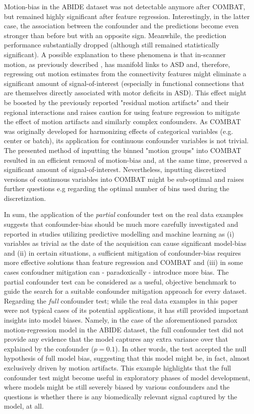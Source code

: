\documentclass{article}
\begin{document}
Motion-bias in the ABIDE dataset was not detectable anymore after COMBAT, but remained highly significant after feature regression.
Interestingly, in the latter case, the association between the confounder and the predictions become even stronger than before but with an opposite sign. Meanwhile, the prediction performance substantially dropped (although still remained statistically significant). 
A possible explanation to these phenomena is that in-scanner motion, as previously described \citep{fournier2010motor, anzulewicz2016toward}, has manifold links to ASD and, therefore, regressing out motion estimates from the connectivity features might eliminate a significant amount of signal-of-interest (especially in functional connections that are themselves directly associated with motor deficits in ASD).
This effect might be boosted by the previously reported "residual motion artifacts" and their regional interactions \citep{spisak2014voxel} and raises caution for using feature regression to mitigate the effect of motion artifacts and similarly complex confounders.
 As COMBAT was originally developed for harmonizing effects of categorical variables (e.g. center or batch), its application for continuous confounder variables is not trivial. The presented method of inputting the binned "motion groups" into COMBAT resulted in an efficient removal of motion-bias and, at the same time, preserved a significant amount of signal-of-interest. 
 Nevertheless, inputting discretized versions of continuous variables into COMBAT might be sub-optimal and raises further questions e.g regarding the optimal number of bins used during the discretization.
 
 In sum, the application of the \emph{partial} confounder test on the real data examples suggests that confounder-bias should be much more carefully investigated and reported in studies utilizing predictive modelling and machine learning as (i) variables as trivial as the date of the acquisition can cause significant model-bias and (ii) in certain situations, a sufficient mitigation of confounder-bias requires more effective solutions than feature regression and COMBAT and (iii) in some cases confoudner mitigation can - paradoxically - introduce more bias. The partial confounder test can be considered as a useful, objective benchmark to guide the search for a suitable confounder mitigation approach for every dataset.
 Regarding the \emph{full} confounder test; while the real data examples in this paper were not typical cases of its potential applications, it has still provided important insights into model biases. Namely, in the case of the aforementioned paradox motion-regression model in the ABIDE dataset, the full confounder test did not provide any evidence that the model captures any extra variance over that explained by the confounder ($p=0.1$). In other words, the test accepted the null hypothesis of full model bias, suggesting that this model might be, in fact, almost exclusively driven by motion artifacts.
This example highlights that the full confounder test might become useful in exploratory phases of model development, where models might be still severely biased by various confounders and the questions is whether there is any biomedically relevant signal captured by the model, at all.
\end{document}
